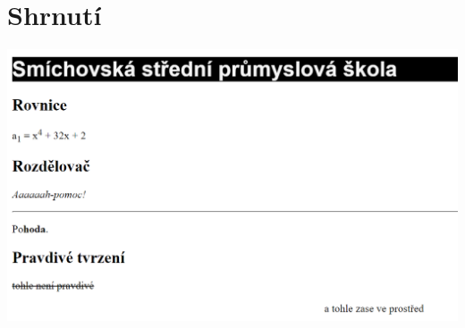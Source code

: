 \documentclass[aspectratio=169]{beamer}
\begin{document}
\section{Shrnutí}
\begin{frame}
    \begin{center}
        \includegraphics[width=\textwidth]{img/html-7-8-ukol.png}
    \end{center}
\end{frame}
\end{document}
